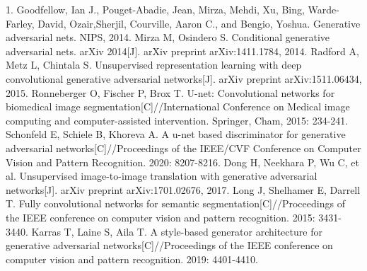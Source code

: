 \documentclass[conference, a4paper]{IEEEtran}
\begin{document}
\begin{thebibliography}{1}	
	 1.	Goodfellow, Ian J., Pouget-Abadie, Jean, Mirza, Mehdi, Xu, Bing, Warde-Farley, David, Ozair,Sherjil, Courville, Aaron C., and Bengio, Yoshua. Generative adversarial nets. NIPS, 2014.
	 Mirza M, Osindero S. Conditional generative adversarial nets. arXiv 2014[J]. arXiv preprint arXiv:1411.1784, 2014.
	 Radford A, Metz L, Chintala S. Unsupervised representation learning with deep convolutional generative adversarial networks[J]. arXiv preprint arXiv:1511.06434, 2015.
	 Ronneberger O, Fischer P, Brox T. U-net: Convolutional networks for biomedical image segmentation[C]//International Conference on Medical image computing and computer-assisted intervention. Springer, Cham, 2015: 234-241.
	 Schonfeld E, Schiele B, Khoreva A. A u-net based discriminator for generative adversarial networks[C]//Proceedings of the IEEE/CVF Conference on Computer Vision and Pattern Recognition. 2020: 8207-8216.
	 Dong H, Neekhara P, Wu C, et al. Unsupervised image-to-image translation with generative adversarial networks[J]. arXiv preprint arXiv:1701.02676, 2017.
	 Long J, Shelhamer E, Darrell T. Fully convolutional networks for semantic segmentation[C]//Proceedings of the IEEE conference on computer vision and pattern recognition. 2015: 3431-3440.
	 Karras T, Laine S, Aila T. A style-based generator architecture for generative adversarial networks[C]//Proceedings of the IEEE conference on computer vision and pattern recognition. 2019: 4401-4410.

\end{thebibliography}
\end{document}
